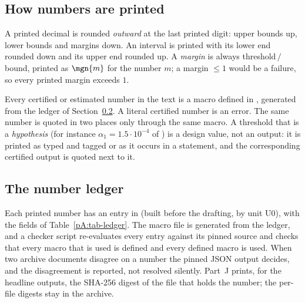 \subsection{How numbers are printed}\label{pA:sec-numbers}
\begin{convention}[rounding]\label{pA:conv-round}
A printed decimal is rounded \emph{outward} at the last printed digit: upper bounds up, lower bounds and margins down. An interval is printed with its lower end rounded down and its upper end rounded up. A \emph{margin} is always threshold$\,/\,$bound, printed as $\mgn{m}$ for the number $m$; a margin $\le1$ would be a failure, so every printed margin exceeds $1$.
\end{convention}
\begin{convention}\label{pA:conv-labels}
Every certified or estimated number in the text is a macro defined in , generated from the ledger of Section~\ref{pA:sec-ledger}. A literal certified number is an error. The same number is quoted in two places only through the same macro. A threshold that is a \emph{hypothesis} (for instance $\alpha_1=1.5\cdot10^{-4}$ of ) is a design value, not an output: it is printed as typed and tagged \thand{} or \tlit{} as it occurs in a statement, and the corresponding certified output is quoted next to it.
\end{convention}

\subsection{The number ledger}\label{pA:sec-ledger}
Each printed number has an entry in  (built before the drafting, by unit U0), with the fields of Table~\ref{pA:tab-ledger}. The macro file is generated from the ledger, and a checker script re-evaluates every entry against its pinned source and checks that every macro that is used is defined and every defined macro is used. When two archive documents disagree on a number the pinned JSON output decides, and the disagreement is reported, not resolved silently. Part~J prints, for the headline outputs, the SHA-256 digest of the file that holds the number; the per-file digests stay in the archive.

